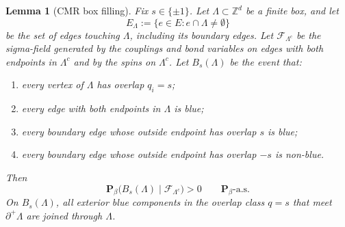 \documentclass[10pt,a4paper]{amsart}
\newtheorem{lemma}{Lemma}
\begin{document}
\begin{lemma}[CMR box filling]\label{lem:resample}
Fix $s\in\{\pm1\}$.
Let $\Lambda\subset\mathbb{Z}^d$ be a finite box, and let
\[
  E_\Lambda:=\{e\in E:e\cap\Lambda\neq\emptyset\}
\]
be the set of edges touching $\Lambda$, including its boundary edges.
Let $\mathscr{F}_{\Lambda^c}$ be the sigma-field generated by the couplings and bond variables on edges with both endpoints in $\Lambda^c$ and by the spins on $\Lambda^c$.
Let $B_s(\Lambda)$ be the event that:
\begin{enumerate}
\item[\textup{(i)}] every vertex of $\Lambda$ has overlap $q_i=s$;
\item[\textup{(ii)}] every edge with both endpoints in $\Lambda$ is blue;
\item[\textup{(iii)}] every boundary edge whose outside endpoint has overlap $s$ is blue;
\item[\textup{(iv)}] every boundary edge whose outside endpoint has overlap $-s$ is non-blue.
\end{enumerate}
Then
\[
  \mathbf{P}_\beta\bigl(B_s(\Lambda)
       \mid\mathscr{F}_{\Lambda^c}\bigr)>0
  \qquad \mathbf{P}_\beta\text{-a.s.}
\]
On $B_s(\Lambda)$, all exterior blue components in the overlap class $q=s$ that meet $\partial^+\Lambda$ are joined through $\Lambda$.
\end{lemma}
\end{document}
